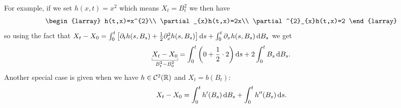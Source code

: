 \documentclass[12pt]{report}
\begin{document}
For example, if we set $h(x,t)=x^{2}$ which means $X_{t}=B^{2}_{t}$ we then have
\begin{equation*}
	\begin{larray}
		h(t,x)=x^{2}\\
		\partial_{x}h(t,x)=2x\\
		\partial^{2}_{x}h(t,x)=2
	\end{larray}
\end{equation*}
so using the fact that $X_{t}-X_{0}=\int_{0}^{t}\left[\partial_{t}h(s,B_{s})+\frac{1}{2}\partial^{2}_{x} h(s,B_{s})\right]\mathop{}\!\mathrm{d} s+\int_{0}^{t}\partial_{x}h(s,B_{s})\mathop{}\!\mathrm{d} B_{s}$ we get
\begin{equation*}
	\ubracketthin{X_{t}-X_{0}}_{B^{2}_{t}-B^{2}_{0}}=\int_{0}^{t}\left(0+\unmezz\cdot2\right)\ds+2\int_{0}^{t}B_{s}\dbs.
\end{equation*}
Another special case is given when we have $h\in\mathcal{C}^{2}(\mathbb{R})$ and $X_{t}=b(B_{t})$:
\begin{equation*}
	X_{t}-X_{0}=\int_{0}^{t}h'(B_{s})\mathop{}\!\mathrm{d} B_{s}+\int_{0}^{t}h''(B_{s})\mathop{}\!\mathrm{d} s.
\end{equation*}
\end{document}
